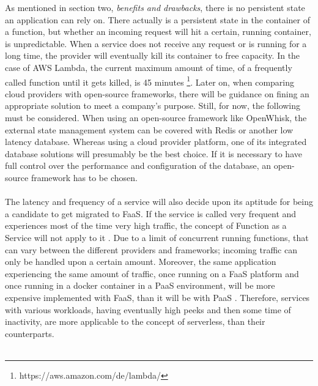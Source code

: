 \documentclass[11pt]{article}
\begin{document}
As mentioned in section two, \textit{benefits and drawbacks}, there is no persistent state an application can rely on. There actually is a persistent state in the container of a function, but whether an incoming request will hit a certain, running container, is unpredictable. When a service does not receive any request or is running for a long time, the provider will eventually kill its container to free capacity. In the case of AWS Lambda, the current maximum amount of time, of a frequently called function until it gets killed, is 45 minutes \footnote{https://aws.amazon.com/de/lambda/}. Later on, when comparing cloud providers with open-source frameworks, there will be guidance on fining an appropriate solution to meet a company's purpose. Still, for now, the following must be considered. When using an open-source framework like OpenWhisk, the external state management system can be covered with Redis or another low latency database. Whereas using a cloud provider platform, one of its integrated database solutions will presumably be the best choice. If it is necessary to have full control over the performance and configuration of the database, an open-source framework has to be chosen. \\\\
The latency and frequency of a service will also decide upon its aptitude for being a candidate to get migrated to FaaS. If the service is called very frequent and experiences most of the time very high traffic, the concept of Function as a Service will not apply to it  \cite{jonas2019cloud}. Due to a limit of concurrent running functions, that can vary between the different providers and frameworks; incoming traffic can only be handled upon a certain amount. Moreover, the same application experiencing the same amount of traffic, once running on a FaaS platform and once running in a docker container in a PaaS environment, will be more expensive implemented with FaaS, than it will be with PaaS \cite{jonas2019cloud}. Therefore, services with various workloads, having eventually high peeks and then some time of inactivity, are more applicable to the concept of serverless, than their counterparts. \\\\
\end{document}
